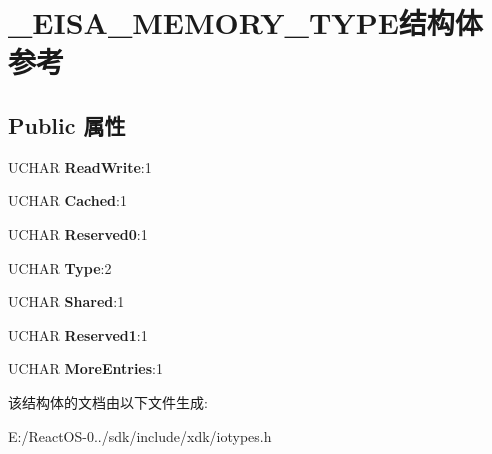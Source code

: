 \hypertarget{struct___e_i_s_a___m_e_m_o_r_y___t_y_p_e}{}\section{\+\_\+\+E\+I\+S\+A\+\_\+\+M\+E\+M\+O\+R\+Y\+\_\+\+T\+Y\+P\+E结构体 参考}
\label{struct___e_i_s_a___m_e_m_o_r_y___t_y_p_e}
\subsection*{Public 属性}
\begin{DoxyCompactItemize}
\item 
\mbox{\label{struct___e_i_s_a___m_e_m_o_r_y___t_y_p_e_a4027bd12cd95ba76fe95193806ce988f}} 
U\+C\+H\+AR {\bfseries Read\+Write}\+:1
\item 
\mbox{\label{struct___e_i_s_a___m_e_m_o_r_y___t_y_p_e_ad84ab4434b941ce155685d885d443ffa}} 
U\+C\+H\+AR {\bfseries Cached}\+:1
\item 
\mbox{\label{struct___e_i_s_a___m_e_m_o_r_y___t_y_p_e_a6e61acd98af7ecba5fdcf4abff95cdb1}} 
U\+C\+H\+AR {\bfseries Reserved0}\+:1
\item 
\mbox{\label{struct___e_i_s_a___m_e_m_o_r_y___t_y_p_e_a685cc4b594edb84e4ab8c6053b101d97}} 
U\+C\+H\+AR {\bfseries Type}\+:2
\item 
\mbox{\label{struct___e_i_s_a___m_e_m_o_r_y___t_y_p_e_aac476692cec08bccc550436ebfa0af93}} 
U\+C\+H\+AR {\bfseries Shared}\+:1
\item 
\mbox{\label{struct___e_i_s_a___m_e_m_o_r_y___t_y_p_e_a783932eb168ca67f14b55c31eada936d}} 
U\+C\+H\+AR {\bfseries Reserved1}\+:1
\item 
\mbox{\label{struct___e_i_s_a___m_e_m_o_r_y___t_y_p_e_a140e888aca415607677355477eb16287}} 
U\+C\+H\+AR {\bfseries More\+Entries}\+:1
\end{DoxyCompactItemize}


该结构体的文档由以下文件生成\+:\begin{DoxyCompactItemize}
\item 
E\+:/\+React\+O\+S-\/0../sdk/include/xdk/iotypes.\+h\end{DoxyCompactItemize}
